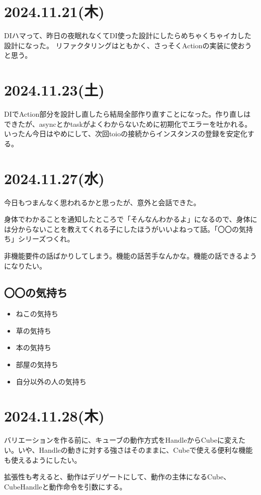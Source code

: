 \documentclass[fleqn,twocolumn]{mynote}
\begin{document}
\section*{2024.11.21(木)}
DIハマって、昨日の夜眠れなくてDI使った設計にしたらめちゃくちゃイカした設計になった。
リファクタリングはともかく、さっそくActionの実装に使おうと思う。

\section*{2024.11.23(土)}
DIでAction部分を設計し直したら結局全部作り直すことになった。作り直しはできたが、asyncとかtaskがよくわからないために初期化でエラーを吐かれる。いったん今日はやめにして、次回toioの接続からインスタンスの登録を安定化する。

\section*{2024.11.27(水)}
今日もつまんなく思われるかと思ったが、意外と会話できた。

身体でわかることを通知したところで「そんなんわかるよ」になるので、身体には分からないことを教えてくれる子にしたほうがいいよねって話。「〇〇の気持ち」シリーズつくれ。

非機能要件の話ばかりしてしまう。機能の話苦手なんかな。機能の話できるようになりたい。

\subsection{〇〇の気持ち}
\begin{itemize}
  \item ねこの気持ち
  \item 草の気持ち
  \item 本の気持ち
  \item  部屋の気持ち
  \item 自分以外の人の気持ち
\end{itemize}

\section*{2024.11.28(木)}
バリエーションを作る前に、キューブの動作方式をHandleからCubeに変えたい。いや、Handleの動きに対する強さはそのままに、Cubeで使える便利な機能も使えるようにしたい。

拡張性も考えると、動作はデリゲートにして、動作の主体になるCube、CubeHandleと動作命令を引数にする。
\end{document}
